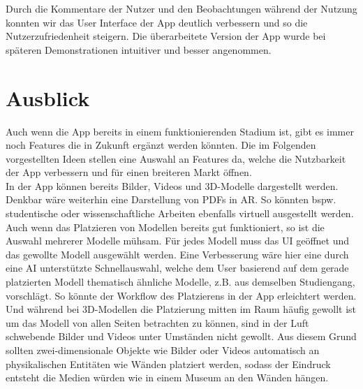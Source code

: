 \documentclass[titlepage, a4paper, 11pt]{scrartcl}
\begin{document}
  Durch die Kommentare der Nutzer und den Beobachtungen während der Nutzung konnten wir das User Interface der App deutlich verbessern und so die Nutzerzufriedenheit steigern. Die überarbeitete Version der App wurde bei späteren Demonstrationen intuitiver und besser angenommen.
  \section{Ausblick}
  Auch wenn die App bereits in einem funktionierenden Stadium ist, gibt es immer noch Features die in Zukunft ergänzt werden könnten. Die im Folgenden vorgestellten Ideen stellen eine Auswahl an Features da, welche die Nutzbarkeit der App verbessern und für einen breiteren Markt öffnen.\\
  In der App können bereits Bilder, Videos und 3D-Modelle dargestellt werden. Denkbar wäre weiterhin eine Darstellung von PDFs in AR. So könnten bspw. studentische oder wissenschaftliche Arbeiten ebenfalls virtuell ausgestellt werden.\\
  Auch wenn das Platzieren von Modellen bereits gut funktioniert, so ist die Auswahl mehrerer Modelle mühsam. Für jedes Modell muss das UI geöffnet und das gewollte Modell ausgewählt werden. Eine Verbesserung wäre hier eine durch eine AI unterstützte Schnellauswahl, welche dem User basierend auf dem gerade platzierten Modell thematisch ähnliche Modelle, z.B. aus demselben Studiengang, vorschlägt. So könnte der Workflow des Platzierens in der App erleichtert werden.\\
  Und während bei 3D-Modellen die Platzierung mitten im Raum häufig gewollt ist um das Modell von allen Seiten betrachten zu können, sind in der Luft schwebende Bilder und Videos unter Umständen nicht gewollt. Aus diesem Grund sollten zwei-dimensionale Objekte wie Bilder oder Videos automatisch an physikalischen Entitäten wie Wänden platziert werden, sodass der Eindruck entsteht die Medien würden wie in einem Museum an den Wänden hängen.\\
\end{document}
